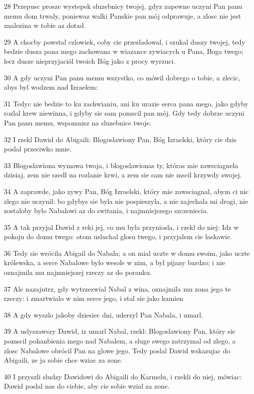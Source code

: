 \par 28 Przepusc prosze wystepek sluzebnicy twojej, gdyz zapewne uczyni Pan panu memu dom trwaly, poniewaz walki Panskie pan mój odprawuje, a zlosc nie jest znalezina w tobie az dotad.
\par 29 A chocby powstal czlowiek, coby cie przesladowal, i szukal duszy twojej, tedy bedzie dusza pana mego zachowana w wiazance zywiacych u Pana, Boga twego; lecz dusze nieprzyjaciól twoich Bóg jako z procy wyrzuci.
\par 30 A gdy uczyni Pan panu memu wszystko, co mówil dobrego o tobie, a zlecic, abys byl wodzem nad Izraelem:
\par 31 Tedyc nie bedzie to ku zachwianiu, ani ku urazie serca pana mego, jako gdyby rozlal krew niewinna, i gdyby sie sam pomscil pan mój. Gdy tedy dobrze uczyni Pan panu memu, wspomnisz na sluzebnice twoje.
\par 32 I rzekl Dawid do Abigaili: Blogoslawiony Pan, Bóg Izraelski, który cie dzis poslal przeciwko mnie.
\par 33 Blogoslawiona wymowa twoja, i blogoslawionas ty, któras mie zawsciagnela dzisiaj, zem nie szedl na rozlanie krwi, a zem sie sam nie mscil krzywdy swojej.
\par 34 A zaprawde, jako zywy Pan, Bóg Izraelski, który mie zawsciagnal, abym ci nic zlego nie uczynil: bo gdybys sie byla nie pospieszyla, a nie zajechala mi drogi, nie zostaloby bylo Nabalowi az do switania, i najmniejszego szczeniecia.
\par 35 A tak przyjal Dawid z reki jej, co mu byla przyniosla, i rzekl do niej: Idz w pokoju do domu twego: otom usluchal glosu twego, i przyjalem cie laskawie.
\par 36 Tedy sie wrócila Abigail do Nabala; a on mial uczte w domu swoim, jako uczte królewska, a serce Nabalowe bylo wesole w nim, a byl pijany bardzo; i nie oznajmila mu najmniejszej rzeczy az do poranku.
\par 37 Ale nazajutrz, gdy wytrzezwial Nabal z wina, oznajmila mu zona jego te rzeczy: i zmartwialo w nim serce jego, i stal sie jako kamien
\par 38 A gdy wyszlo jakoby dziesiec dni, uderzyl Pan Nabala, i umarl.
\par 39 A uslyszawszy Dawid, iz umarl Nabal, rzekl: Blogoslawiony Pan, który sie pomscil pohanbienia mego nad Nabalem, a sluge swego zatrzymal od zlego, a zlosc Nabalowe obrócil Pan na glowe jego. Tedy poslal Dawid wskazujac do Abigaili, ze ja sobie chce wziac za zone.
\par 40 I przyszli sludzy Dawidowi do Abigaili do Karmelu, i rzekli do niej, mówiac: Dawid poslal nas do ciebie, aby cie sobie wzial za zone.
